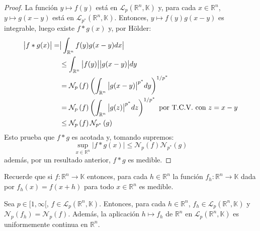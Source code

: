 \documentclass[12pt]{report}
\theoremstyle{largebreak}
\newcommand\cf[3]{\ensuremath{#1:#2\rightarrow#3}}
\newcommand\abs[1]{\ensuremath{\big|#1\big|}}
\newcommand{\N}[2]{\ensuremath{\mathcal{N}_{#1}\left(#2\right)}}
\begin{document}
    \begin{proof}
        La función $y\mapsto f(y)$ está en $\mathcal{L}_p(\mathbb{R}^n,\mathbb{K})$ y, para cada $x\in\mathbb{R}^n$, $y\mapsto g(x-y)$ está en $\mathcal{L}_{ p^*}(\mathbb{R}^n,\mathbb{K})$. Entonces, $y\mapsto f(y)g(x-y)$ es integrable, luego existe $f*g(x)$ y, por Hölder:
        \begin{equation*}
            \begin{split}
                \abs{f*g(x)}=
                &\abs{\int_{\mathbb{R}^n}f(y)g(x-y)dx}\\
                &\leq\int_{\mathbb{R}^n}\abs{f(y)}\abs{g(x-y)}dy\\
                &=\N{p}{f}\left(\int_{\mathbb{R}^n}\abs{g(x-y)}^{ p^*}dy \right)^{1/p^*}\\
                &= \N{p}{f}\left(\int_{\mathbb{R}^n}\abs{g(z)}^{ p^*}dz \right)^{1/p^*}\textup{ por T.C.V. con }z=x-y \\
                &\leq\N{p}{f}\N{p^*}{g}\\
            \end{split}
        \end{equation*}
        Esto prueba que $f*g$ es acotada y, tomando supremos:
        \begin{equation*}
            \sup_{x\in\mathbb{R}^n}\abs{f*g(x)}\leq\N{p}{f}\N{p^*}{g}
        \end{equation*}
        además, por un resultado anterior, $f*g$ es medible.
    \end{proof}

    \begin{obs}
        Recuerde que si $\cf{f}{\mathbb{R}^n}{\mathbb{K}}$ entonces, para cada $h\in\mathbb{R}^n$ la función $\cf{f_h}{\mathbb{R}^n}{\mathbb{K}}$ dada por $f_h(x)=f(x+h)$ para todo $x\in\mathbb{R}^n$ es medible.
    \end{obs}

    \begin{lema}
        Sea $p\in[1,\infty[$, $f\in\mathcal{L}_p(\mathbb{R}^n,\mathbb{K})$. Entonces, para cada $h\in\mathbb{R}^n$, $f_h\in\mathcal{L}_p(\mathbb{R}^n,\mathbb{K})$ y $\N{p}{f_h}=\N{p}{f}$. Además, la aplicación $h\mapsto f_h$ de $\mathbb{R}^n$ en $\mathcal{L}_p(\mathbb{R}^n,\mathbb{K})$ es uniformemente continua en $\mathbb{R}^n$.
    \end{lema}
\end{document}

